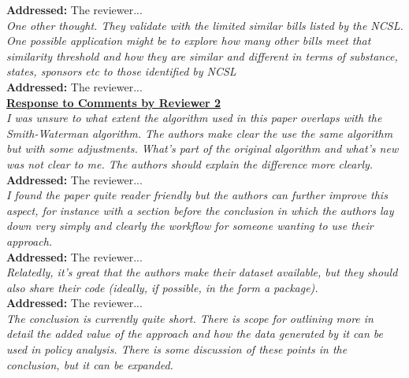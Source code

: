 \documentclass[12pt]{article}
\newcommand{\grey}[1]{{\color{mygrey}#1}}
\begin{document}
\noindent \textcolor{MyGreen}{\textbf{Addressed:}} The reviewer... \\

 \grey{\emph{  One other thought. They validate with the limited similar bills listed by the NCSL. One possible application might be to explore how many other bills meet that similarity threshold and how they are similar and different in terms of substance, states, sponsors etc to those identified by NCSL}}\\

\noindent \textcolor{MyGreen}{\textbf{Addressed:}} The reviewer... \\

\noindent \underline{\textbf{Response to Comments by Reviewer 2}}\\

 \grey{\emph{   I was unsure to what extent the algorithm used in this paper overlaps with the Smith-Waterman algorithm. The authors make clear the use the same algorithm but with some adjustments. What's part of the original algorithm and what's new was not clear to me. The authors should explain the difference more clearly.}}\\

\noindent \textcolor{MyGreen}{\textbf{Addressed:}} The reviewer... \\

 \grey{\emph{  I found the paper quite reader friendly but the authors can further improve this aspect, for instance with a section before the conclusion in which the authors lay down very simply and clearly the workflow for someone wanting to use their approach.}}\\

\noindent \textcolor{MyGreen}{\textbf{Addressed:}} The reviewer... \\

 \grey{\emph{ Relatedly, it's great that the authors make their dataset available, but they should also share their code (ideally, if possible, in the form a package).}}\\

\noindent \textcolor{MyGreen}{\textbf{Addressed:}} The reviewer... \\

 \grey{\emph{ The conclusion is currently quite short. There is scope for outlining more in detail the added value of the approach and how the data generated by it can be used in policy analysis. There is some discussion of these points in the conclusion, but it can be expanded.}}\\
\end{document}

